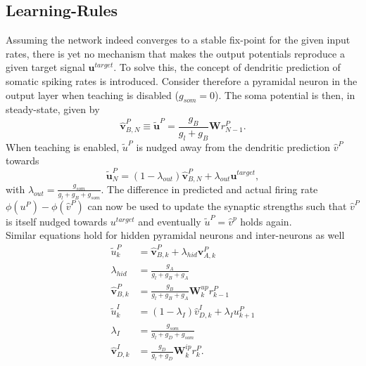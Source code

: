 \documentclass[12pt,a4paper]{article}
\begin{document}
\subsection{Learning-Rules}
Assuming the network indeed converges to a stable fix-point for the given input rates, there is yet no mechanism that makes the output potentials reproduce a given target signal $\bm{u}^{target}$. To solve this, the concept of dendritic prediction of somatic spiking rates is introduced. Consider therefore a pyramidal neuron in the output layer when teaching is disabled ($g_{som}=0$). The soma potential is then, in steady-state, given by
\begin{equation}
\hat{\bm{v}}^P_{B,N} \equiv \tilde{\bm{u}}^P = \frac{g_B}{g_l + g_B}\bm{W}r^P_{N-1}.
\end{equation} 
When teaching is enabled, $\tilde{u}^P$ is nudged away from the dendritic prediction $\hat{v}^P$ towards
\begin{equation}
\tilde{\bm{u}}^P_N = (1-\lambda_{out})\hat{\bm{v}}^P_{B,N} + \lambda_{out}\bm{u}^{target},\label{eq:out_stead}
\end{equation}
with $\lambda_{out} = \frac{g_{som}}{g_l + g_B + g_{som}}$.
The difference in predicted and actual firing rate $\phi(u^P) - \phi(\hat{v}^P)$ can now be used to update the synaptic strengths such that $\hat{v}^P$ is itself nudged towards $u^{target}$ and eventually $\tilde{u}^P = \hat{v}^p$ holds again.\\
Similar equations hold for hidden pyramidal neurons and inter-neurons as well
\begin{align}
\tilde{u}^P_k &= \hat{\bm{v}}^P_{B,k} + \lambda_{hid}\bm{v}^P_{A,k}\\ \lambda_{hid} &= \frac{g_A}{g_l + g_B + g_A}\\
\hat{\bm{v}}^P_{B,k} &= \frac{g_B}{g_l + g_B + g_A}\bm{W}^{up}_kr^P_{k-1}\label{eq:basal_pyr}\\
\tilde{u}^I_k &= (1-\lambda_I)\hat{v}^I_{D,k} + \lambda_{I}u^P_{k+1}\\ \lambda_{I} &= \frac{g_{som}}{g_l + g_D + g_{som}}\\
\hat{\bm{v}}^I_{D,k} &= \frac{g_D}{g_l + g_D}\bm{W}^{ip}_kr^P_k \label{eq:dend_int}.
\end{align}
\end{document}
